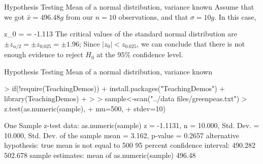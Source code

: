 \documentclass[t]{beamer}
\begin{document}

\begin{ftst}
{Hypothesis Testing}
{Mean of a normal distribution, variance known}
Assume that we got $\bar{x} = 496.48 g$ from our $n=10$ observations, and that $\sigma = 10g$. In this case,

\beqs 
z_0 =  = -1.113
\eqs
\vhalf
The critical values of the standard normal distribution are $\pm z_{\alpha/2} = \pm z_{0.025} = \pm 1.96$;
\vone
Since $|z_0|<z_{0.025}$, we can conclude that there is not enough evidence to reject $H_0$ at the $95\%$ confidence level.
\end{ftst}


\begin{ftstf}
{Hypothesis Testing}
{Mean of a normal distribution, variance known}

\begin{rcode}
> if(!require(TeachingDemos)){
+ 	install.packages("TeachingDemos")
+ 	library(TeachingDemos)
+ }
> 
> sample<-scan("../data files/greenpeas.txt")
> z.test(as.numeric(sample),
+        mu=500,
+        stdev=10)

One Sample z-test
data:  as.numeric(sample)
z = -1.1131, n = 10.000, Std. Dev. = 10.000, 
Std. Dev. of the sample mean = 3.162, 
p-value = 0.2657
alternative hypothesis: true mean is not equal to 500
95 percent confidence interval:
 490.282 502.678
sample estimates:
mean of as.numeric(sample) 
                    496.48 
\end{rcode}
\end{ftstf}
\end{document}
